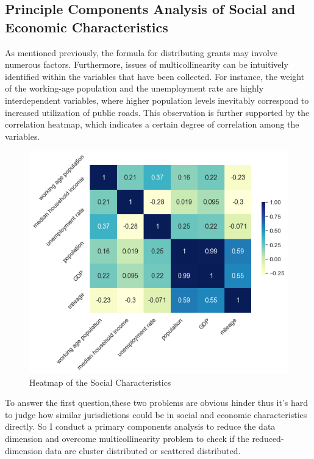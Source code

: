 \subsection{Principle Components Analysis of Social and Economic Characteristics}
As mentioned previously, the formula for distributing grants may involve numerous factors. Furthermore, issues of multicollinearity can be intuitively identified within the variables that have been collected. For instance, the weight of the working-age population and the unemployment rate are highly interdependent variables, where higher population levels inevitably correspond to increased utilization of public roads. This observation is further supported by the correlation heatmap, which indicates a certain degree of correlation among the variables.
\begin{figure}[H]
  \centering
  \includegraphics[scale=0.7]{Chapter-3/Figures/heatmap.png}
  \caption[Heatmap of the Social Characteristics]{Heatmap of the Social Characteristics
    \texttt{} }
  \label{heatmap}
\end{figure}

To answer the first question,these two problems are obvious hinder thus it's hard to judge how similar jurisdictions could be in social and economic characteristics directly. So I conduct a primary components analysis to reduce the data dimension and overcome multicollinearity problem to check if the reduced-dimension data are cluster distributed or scattered distributed.

